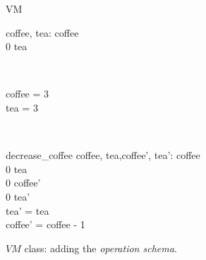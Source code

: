 \begin{figure}[H]
\centering
\begin{class}{VM}
\\
\begin{state}
coffee, tea: \integer
{} \leq  coffee 
\\
0 \leq  tea 
\end{state} 
\\
\begin{init}
coffee = 3
\\tea = 3
\end{init} 
\\
\begin{op}{decrease\_coffee}
coffee, tea,coffee', tea': \integer
{} \leq  coffee 
\\
0 \leq  tea 
\\
0 \leq  coffee' 
\\
0 \leq  tea' 
\\
tea' = tea
\\
coffee' = coffee - 1
\end{op}
\end{class}
\caption{$VM$ class: adding the \textit{operation schema}.}
\label{oz_vm_op_schema}
\end{figure}